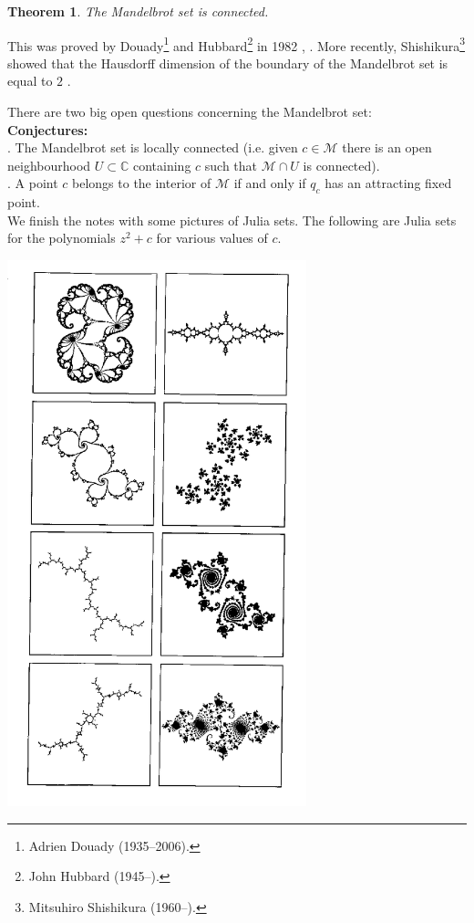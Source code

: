 \documentclass[12pt]{article}
\newtheorem{theorem}{Theorem}[section]
\theoremstyle{definition}
\theoremstyle{remark}
\begin{document}
\begin{theorem}
The Mandelbrot set is connected.
\end{theorem}
This was proved by Douady\footnote{Adrien Douady (1935--2006).} and Hubbard\footnote{John Hubbard (1945--).} in 1982 \cite{DH82}, \cite{DH85}. 
More recently, Shishikura\footnote{Mitsuhiro Shishikura (1960--).} showed that the Hausdorff dimension of the boundary of the Mandelbrot
set is equal to $2$ \cite{Shi98}.


There are two big open questions concerning the Mandelbrot set:\\

\noindent
\textbf{Conjectures:}\\
. The Mandelbrot set is  locally connected (i.e. given $c \in \mathcal M$ there is an open neighbourhood $U \subset \mathbb{C}$ containing $c$ such that $\mathcal M \cap U$ is connected).\\
. A point $c$ belongs to the interior of $\mathcal M$ if and only if $q_c$ has an attracting fixed point.\\



We finish the notes with some pictures of Julia sets. The following are Julia sets for the polynomials $z^2 + c$ for various values of $c$.

\vspace{4mm}
{\centering
\includegraphics[width=0.65\textwidth]{juliasets} 
\par}
\end{document}
